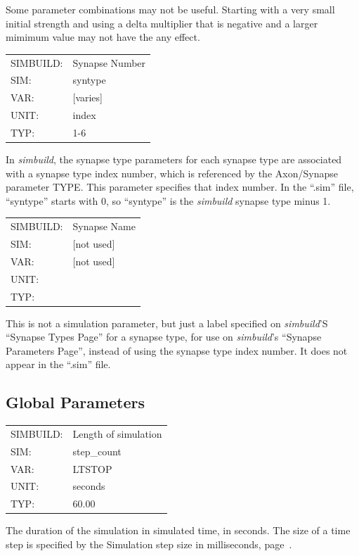 \documentclass[12pt,openany,oneside]{book}
\newcommand{\tiref}[1]{#1, page~\pageref{#1}}
\newcommand{\prog}[1]{\textit{{#1}}}
\newcommand{\ext}[1]{{{``.#1''}}}
\newcommand{\inquotes}[1]{{{``#1''}}}
\begin{document}
Some parameter combinations may not be
useful. Starting with a very small initial strength and using a delta
multiplier that is negative and a larger mimimum value may not have the
any effect.

\filbreak
\vspace{\baselineskip}


\begin{flushleft}
\begin{tabular}{@{}ll@{}}
SIMBUILD: & Synapse Number\\
SIM: & syntype\\
VAR: & [varies]\\
UNIT: & index\\
TYP: & 1-6\\
\end{tabular}
\end{flushleft}
\noindent
In \prog{simbuild}, the synapse type parameters for each synapse type are
associated with a synapse type index number, which is referenced by
the Axon/Synapse parameter TYPE. This parameter specifies that index
number. In the \ext{sim} file, \inquotes{syntype} starts with 0, so
\inquotes{syntype} is the
\prog{simbuild} synapse type minus 1.
\filbreak
\vspace{\baselineskip}

\begin{flushleft}
\begin{tabular}{@{}ll@{}}
SIMBUILD: & Synapse Name\\
SIM: & [not used]\\
VAR: & [not used]\\
UNIT: & \\
TYP: &\\
\end{tabular}
\end{flushleft}
\noindent
This is not a simulation parameter, but just a label specified on
\prog{simbuild}'S \inquotes{Synapse Types Page} for a synapse type, for use
on \prog{simbuild}'s \inquotes{Synapse Parameters Page}, instead of using the synapse
type index number. It does not appear in the \ext{sim} file.
\filbreak
\vspace{\baselineskip}

\subsection{Global Parameters}
\label{Global Parameters}

\begin{flushleft}
\begin{tabular}{@{}ll@{}}
SIMBUILD: & Length of simulation\\
SIM: & step\_count\\
VAR: & LTSTOP\\
UNIT: & seconds\\
TYP: & 60.00\\
\end{tabular}
\end{flushleft}
\noindent
The duration of the simulation in simulated time, in seconds. The
size of a time step is specified by the \tiref{Simulation step size in milliseconds}.
\filbreak
\vspace{\baselineskip}
\end{document}
